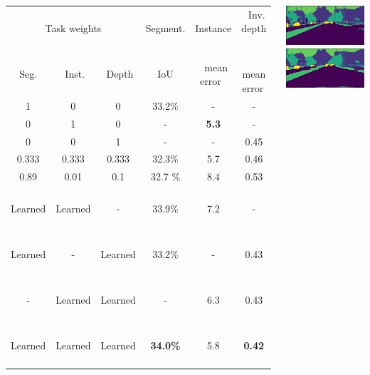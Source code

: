 \documentclass[15pt,margin=1in,innermargin=-4.5in,blockverticalspace=-0.25in]{tikzposter}
\begin{document}
\begin{columns}
{   	
	
	
	 \vspace{0.5em}
	\begin{center}
   	\begin{tabular}{c c  c | c c c }
  	\hline			
  	  \multicolumn{3}{c|}{Task weights} & $\>$ Segment. $\>$ &Instance& $\>$ Inv. depth$\>$ \\
	
	 $\>$Seg.$\>$ &$\>$ Inst.$\>$ &$\>$ Depth$\>$ & IoU &  $\>$ mean error $\>$  & $\>$ mean error$\>$ \\
	\hline
  	 1 		& 0 	& 0			&33.2\% 	& -			&-\\
  	  0  	&  1 	& 0 		& -			&\textbf{5.3}	&-\\
	 0 		& 0 	&	1		&-			& -			& 0.45 \\ \hline 
	 0.333 & 0.333 & 0.333 		& 32.3\% 	& 5.7		& 0.46 \\
	 0.89 	&0.01	&0.1		&32.7 \%	&8.4		&0.53\\ \hline
	  $\:$ Learned $\:$ &	$\:$ Learned$\:$ 	& - 	&33.9\%		&7.2		& - \\
	 $\:$ Learned$\:$  & - &$\:$  Learned 	$\:$ 	& 33.2\% 	& - 		& 0.43 \\
	 - &$\:$  Learned $\:$ & $\:$ Learned $\:$ 		& - 		& 6.3		& 0.43 \\\hline
	 $\:$ Learned$\:$  &$\:$  Learned $\:$ & $\:$ Learned	$\:$ &\textbf{34.0\%} & 5.8 & \textbf{0.42} \\
 	 \hline  
	\end{tabular}
	\end{center}
   \vspace{0.5em}
   
    \begin{tikzfigure}
    \includegraphics[width=0.4\linewidth]{repro2.png}
            \includegraphics[width=0.4\linewidth]{repro1.png}
        \end{tikzfigure}
	
}
\end{columns}
\end{document}
